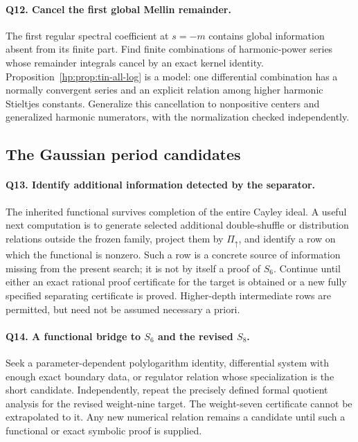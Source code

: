 \paragraph{Q12. Cancel the first global Mellin remainder.}
The first regular spectral coefficient at $s=-m$ contains global
information absent from its finite part. Find finite combinations of
harmonic-power series whose remainder integrals cancel by an exact
kernel identity. Proposition~\ref{hp:prop:tin-all-log} is a model:
one differential combination has a normally convergent series and an
explicit relation among higher harmonic Stieltjes constants. Generalize
this cancellation to nonpositive centers and generalized harmonic
numerators, with the normalization checked independently.

\subsection{The Gaussian period candidates}

\paragraph{Q13. Identify additional information detected by the separator.}
The inherited functional survives completion of the entire Cayley
ideal. A useful next computation is to generate selected additional
double-shuffle or distribution relations outside the frozen family,
project them by $\Pi_\uparrow$, and identify a row on which the
functional is nonzero. Such a row is a concrete source of information
missing from the present search; it is not by itself a proof of $S_6$.
Continue until either an exact rational proof certificate for the
target is obtained or a new fully specified separating certificate is
proved. Higher-depth intermediate rows are permitted, but need not be
assumed necessary a priori.

\paragraph{Q14. A functional bridge to $S_6$ and the revised $S_8$.}
Seek a parameter-dependent polylogarithm identity, differential system
with enough exact boundary data, or regulator relation whose
specialization is the short candidate. Independently, repeat the
precisely defined formal quotient analysis for the revised weight-nine
target. The weight-seven certificate cannot be extrapolated to it.
Any new numerical relation remains a candidate until such a functional
or exact symbolic proof is supplied.

